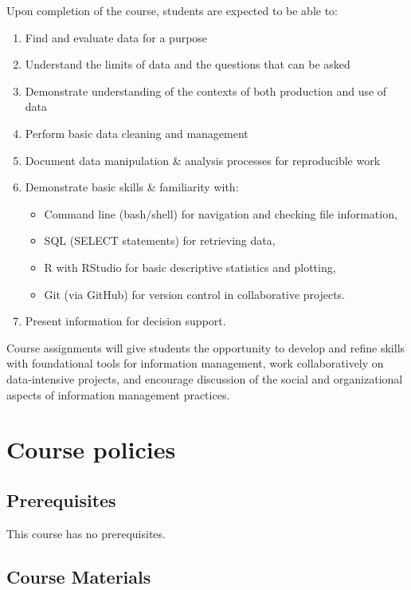 \documentclass[11pt]{article}
\begin{document}
Upon completion of the course, students are expected to be able to:

\begin{enumerate}[nolistsep]
	\item Find and evaluate data for a purpose
	\item Understand the limits of data and the questions that can be asked
	\item Demonstrate understanding of the contexts of both production and use of data
	\item Perform basic data cleaning and management
	\item Document data manipulation \& analysis processes for reproducible work
	\item Demonstrate basic skills \& familiarity with: 
	\begin{itemize}
	\item Command line (bash/shell) for navigation and checking file information,
	\item SQL (SELECT statements) for retrieving data, 
	\item R with RStudio for basic descriptive statistics and plotting, 
	\item Git (via GitHub) for version control in collaborative projects.
	\end{itemize}
	\item Present information for decision support.
\end{enumerate}

Course assignments will give students the opportunity to develop and refine skills with foundational tools for information management, work collaboratively on data-intensive projects, and encourage discussion of the social and organizational aspects of information management practices.

\clearpage

\section{Course policies}
\subsection{Prerequisites}
This course has no prerequisites.

\subsection{Course Materials}
\end{document}
